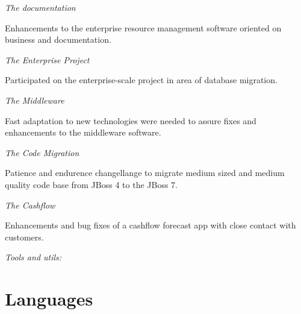 \documentclass[11pt,a4paper,sans]{moderncv} %
\begin{document}
\textit{The documentation}\par
Enhancements to the enterprise resource management software oriented on business and documentation.

\textit{The Enterprise Project}\par
Participated on the enterprise-scale project in area of database migration.

\textit{The Middleware}\par
Fast adaptation to new technologies were needed to assure fixes and enhancements to the middleware software.

\textit{The Code Migration}\par
Patience and endurence changellange to migrate medium sized and medium quality code base from JBoss 4 to the JBoss 7.

\textit{The Cashflow}\par
Enhancements and bug fixes of a cashflow forecast app with close contact with customers.

\textit{Tools and utils:}\par
{}



\section{Languages}

\end{document}
